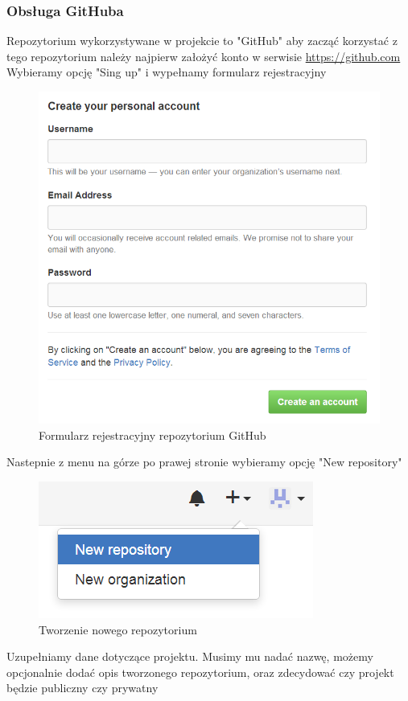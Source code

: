 \subsubsection{Obsługa GitHuba}
Repozytorium wykorzystywane w projekcie to "GitHub" aby zacząć korzystać z tego repozytorium należy najpierw założyć konto w serwisie \href{https://github.com}{https://github.com}
Wybieramy opcję "Sing up" i wypełnamy formularz rejestracyjny
\begin{figure}[H]
	\centering
	\includegraphics {fig/rejestracja}
	\caption{Formularz rejestracyjny repozytorium GitHub}
	\label{fig:rejestracja}
\end{figure}
Nastepnie z menu na górze po prawej stronie wybieramy opcję "New repository"
\begin{figure}[H]
	\centering
	\includegraphics{fig/new_project}
	\caption{Tworzenie nowego repozytorium}
	\label{fig:new_project}
\end{figure}
Uzupełniamy dane dotyczące projektu. Musimy mu nadać nazwę, możemy opcjonalnie dodać opis tworzonego repozytorium, oraz zdecydować czy projekt będzie publiczny czy prywatny

